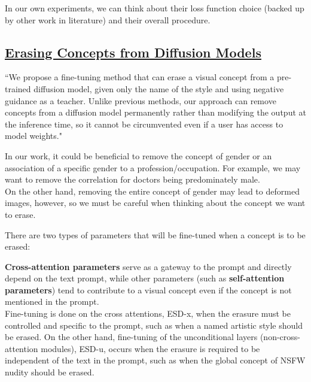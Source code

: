 \documentclass[12pt]{amsart}
\begin{document}
\begin{discussion*}
In our own experiments, we can think about their loss function choice (backed up by other work in literature) and their overall procedure.
\end{discussion*}

\newpage

\subsection{\href{https://arxiv.org/pdf/2303.07345.pdf}{Erasing Concepts from Diffusion Models}}

\begin{approach*}
``We propose a fine-tuning method that can erase a visual concept from a pre-trained diffusion model, given only the name of the style and using negative guidance as a teacher. Unlike previous methods, our approach can remove concepts
from a diffusion model permanently rather than modifying
the output at the inference time, so it cannot be circumvented
even if a user has access to model weights."
\end{approach*}

\begin{discussion*}
In our work, it could be beneficial to remove the concept of gender or an association of a specific gender to a profession/occupation. For example, we may want to remove the correlation for doctors being predominately male. \\

On the other hand, removing the entire concept of gender may lead to deformed images, however, so we must be careful when thinking about the concept we want to erase.
\end{discussion*}

There are two types of parameters that will be fine-tuned when a concept is to be erased: 

\textbf{Cross-attention parameters} serve as a gateway to the prompt and directly depend on the text prompt, while other parameters (such as \textbf{self-attention parameters}) tend to contribute to a visual concept even if the concept is not mentioned in the prompt. \\

Fine-tuning is done on the cross attentions,
ESD-x, when the erasure must be controlled and
specific to the prompt, such as when a named artistic style
should be erased. On the other hand, fine-tuning of the unconditional layers (non-cross-attention modules), ESD-u, occurs when the erasure is required to be independent of the text in the
prompt, such as when the global concept of NSFW nudity
should be erased. 
\end{document}

